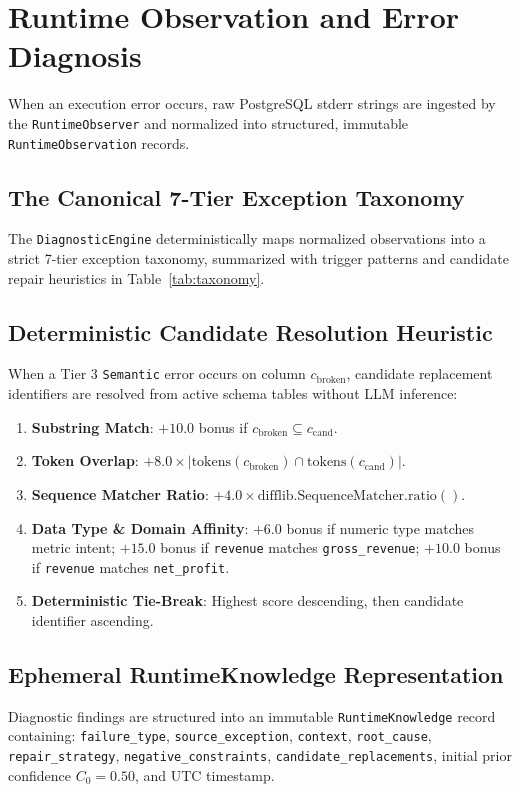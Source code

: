\documentclass[conference]{IEEEtran}
\begin{document}
\section{Runtime Observation and Error Diagnosis}
When an execution error occurs, raw PostgreSQL stderr strings are ingested by the \texttt{RuntimeObserver} and normalized into structured, immutable \texttt{RuntimeObservation} records.

\subsection{The Canonical 7-Tier Exception Taxonomy}
The \texttt{DiagnosticEngine} deterministically maps normalized observations into a strict 7-tier exception taxonomy, summarized with trigger patterns and candidate repair heuristics in Table~\ref{tab:taxonomy}.



\subsection{Deterministic Candidate Resolution Heuristic}
When a Tier 3 \texttt{Semantic} error occurs on column $c_{\text{broken}}$, candidate replacement identifiers are resolved from active schema tables without LLM inference:
\begin{enumerate}
    \item \textbf{Substring Match}: $+10.0$ bonus if $c_{\text{broken}} \subseteq c_{\text{cand}}$.
    \item \textbf{Token Overlap}: $+8.0 \times |\text{tokens}(c_{\text{broken}}) \cap \text{tokens}(c_{\text{cand}})|$.
    \item \textbf{Sequence Matcher Ratio}: $+4.0 \times \text{difflib.SequenceMatcher.ratio}()$.
    \item \textbf{Data Type \& Domain Affinity}: $+6.0$ bonus if numeric type matches metric intent; $+15.0$ bonus if \texttt{revenue} matches \texttt{gross\_revenue}; $+10.0$ bonus if \texttt{revenue} matches \texttt{net\_profit}.
    \item \textbf{Deterministic Tie-Break}: Highest score descending, then candidate identifier ascending.
\end{enumerate}

\subsection{Ephemeral RuntimeKnowledge Representation}
Diagnostic findings are structured into an immutable \texttt{RuntimeKnowledge} record containing: \texttt{failure\_type}, \texttt{source\_exception}, \texttt{context}, \texttt{root\_cause}, \texttt{repair\_strategy}, \texttt{negative\_constraints}, \texttt{candidate\_replacements}, initial prior confidence $C_0 = 0.50$, and UTC timestamp.
\end{document}
